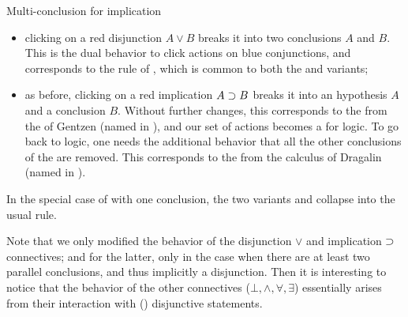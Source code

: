 \begin{scope}
\begin{marginfigure}
  \caption{Multi-conclusion  for implication}
\end{marginfigure}

\begin{itemize}
  \item clicking on a red disjunction $A \lor B$ breaks it into two conclusions
  $A$ and $B$. This is the dual behavior to click actions on blue conjunctions,
  and corresponds to the {} rule of , which is
  common to both the  and  variants;
  \item as before, clicking on a red implication $A \supset B$ breaks it into an
  hypothesis $A$ and a conclusion $B$. Without further changes, this corresponds
  to the  from the    of Gentzen (named {} in
  ), and our set of actions becomes a 
  for  logic. To go back to  logic, one needs
  the additional behavior that all the other conclusions of the  are
  removed. This corresponds to the  from the
   calculus of Dragalin (named {} in
  ).
\end{itemize}

\begin{remark}
  In the special case of   with one conclusion, the two
  variants {} and {} collapse into the usual
  {} rule.
\end{remark}
Note that we only modified the behavior of the disjunction $\lor$ and
implication $\supset$ connectives; and for the latter, only in the case when there
are at least two parallel conclusions, and thus implicitly a disjunction. Then
it is interesting to notice that the  behavior of the other connectives
($\bot, \land, \forall, \exists$) essentially arises from their interaction with
() disjunctive statements.


\end{scope}
